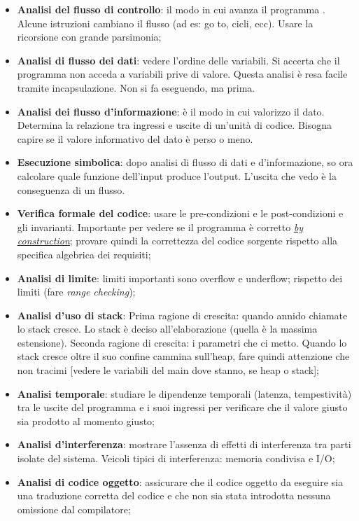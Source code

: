 		\begin{itemize}
			\item \textbf{Analisi del flusso di controllo}: il modo in cui avanza il programma .%
			Alcune istruzioni cambiano il flusso (ad es: go to, cicli, ecc). Usare la ricorsione con grande parsimonia;
			\item\textbf{Analisi di flusso dei dati}: vedere l'ordine delle variabili. Si accerta che il programma non acceda a variabili prive di valore. Questa analisi è resa facile tramite incapsulazione. Non si fa eseguendo, ma prima. 
			\item \textbf{Analisi dei flusso d'informazione}: è il modo in cui valorizzo il dato. Determina la relazione tra ingressi e uscite di un'unità di codice. Bisogna capire se il valore informativo del dato è perso o meno.
			\item \textbf{Esecuzione simbolica}: dopo analisi di flusso di dati e d'informazione, so ora calcolare quale funzione dell'input produce l'output. L'uscita che vedo è la conseguenza di un flusso.
			\item \textbf{Verifica formale del codice}: usare le pre-condizioni e le post-condizioni e gli invarianti. Importante per vedere se il programma è corretto \textit{\underline{\hyperref[byconstruction]{by construction}}}; provare quindi la correttezza del codice sorgente rispetto alla specifica algebrica dei requisiti;
			\item \textbf{Analisi di limite}: limiti importanti sono overflow e underflow; rispetto dei limiti (fare \textit{range checking});
			\item \textbf{Analisi d'uso di stack}: Prima ragione di crescita: quando annido chiamate lo stack cresce. Lo stack è deciso all'elaborazione (quella è la massima estensione). Seconda ragione di crescita: i parametri che ci metto. Quando lo stack cresce oltre il suo confine cammina sull'heap, fare quindi attenzione che non tracimi [vedere le variabili del main dove stanno, se heap o stack];
			\item \textbf{Analisi temporale}: studiare le dipendenze temporali (latenza, tempestività) tra le uscite del programma e i suoi ingressi per verificare che il valore giusto sia prodotto al momento giusto;
			\item \textbf{Analisi d'interferenza}: mostrare l’assenza di effetti di interferenza tra parti isolate del sistema. Veicoli tipici di interferenza: memoria condivisa e I/O;
			\item \textbf{Analisi di codice oggetto}: assicurare che il codice oggetto da eseguire sia una traduzione corretta del codice e che non sia stata introdotta nessuna omissione dal compilatore;
		\end{itemize}
		
